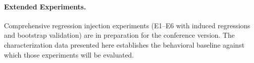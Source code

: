 \paragraph{Extended Experiments.}
Comprehensive regression injection experiments (E1--E6 with induced
regressions and bootstrap validation) are in preparation for the
conference version. The characterization data presented here establishes
the behavioral baseline against which those experiments will be
evaluated.

